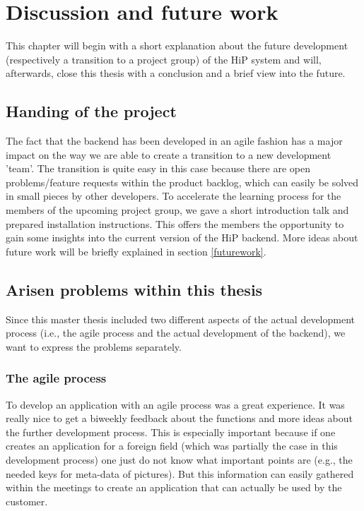 \chapter[Discussion and future work]{Discussion and future work}
This chapter will begin with a short explanation about the future development (respectively a transition to a project group) of the \ac{HiP} system and will, afterwards, close this thesis with a conclusion and a brief view into the future. 

\section{Handing of the project}
The fact that the backend has been developed in an agile fashion has a major impact on the way we are able to create a transition to a new development 'team'.  The transition is quite easy in this case because there are open problems/feature requests within the product backlog, which can easily be solved in small pieces by other developers. To accelerate the learning process for the members of the upcoming project group, we gave a short introduction talk and prepared installation instructions. This offers the members the opportunity to gain some insights into the current version of the \ac{HiP} backend. More ideas about future work will be briefly explained in section \ref{futurework}. 

\section{Arisen problems within this thesis}
Since this master thesis included two different aspects of the actual development process (i.e., the agile process and the actual development of the backend), we want to express the problems separately. 

\subsection{The agile process}
To develop an application with an agile process was a great experience. It was really nice to get a biweekly feedback about the functions and more ideas about the further development process. This is especially important because if one creates an application for a foreign field (which was partially the case in this development process) one just do not know what important points are (e.g., the needed keys for meta-data of pictures). But this information can easily gathered within the meetings to create an application that can actually be used by the customer. 

